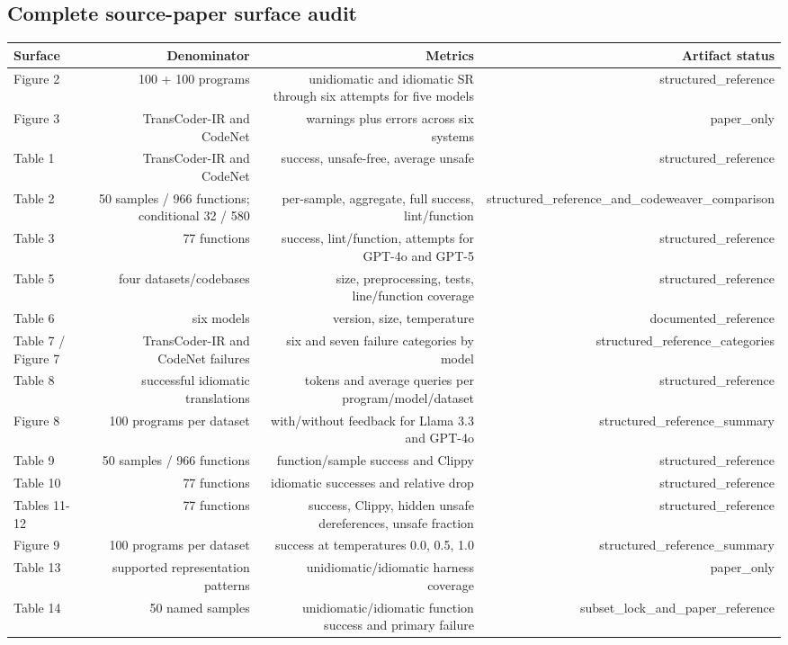 \documentclass{article}
\begin{document}
\subsection*{Complete source-paper surface audit}

\begin{tabular}{lrrr}
\toprule
Surface & Denominator & Metrics & Artifact status \\
\midrule
Figure 2 & 100 + 100 programs & unidiomatic and idiomatic SR through six attempts for five models & structured\_reference \\
Figure 3 & TransCoder-IR and CodeNet & warnings plus errors across six systems & paper\_only \\
Table 1 & TransCoder-IR and CodeNet & success, unsafe-free, average unsafe & structured\_reference \\
Table 2 & 50 samples / 966 functions; conditional 32 / 580 & per-sample, aggregate, full success, lint/function & structured\_reference\_and\_codeweaver\_comparison \\
Table 3 & 77 functions & success, lint/function, attempts for GPT-4o and GPT-5 & structured\_reference \\
Table 5 & four datasets/codebases & size, preprocessing, tests, line/function coverage & structured\_reference \\
Table 6 & six models & version, size, temperature & documented\_reference \\
Table 7 / Figure 7 & TransCoder-IR and CodeNet failures & six and seven failure categories by model & structured\_reference\_categories \\
Table 8 & successful idiomatic translations & tokens and average queries per program/model/dataset & structured\_reference \\
Figure 8 & 100 programs per dataset & with/without feedback for Llama 3.3 and GPT-4o & structured\_reference\_summary \\
Table 9 & 50 samples / 966 functions & function/sample success and Clippy & structured\_reference \\
Table 10 & 77 functions & idiomatic successes and relative drop & structured\_reference \\
Tables 11-12 & 77 functions & success, Clippy, hidden unsafe dereferences, unsafe fraction & structured\_reference \\
Figure 9 & 100 programs per dataset & success at temperatures 0.0, 0.5, 1.0 & structured\_reference\_summary \\
Table 13 & supported representation patterns & unidiomatic/idiomatic harness coverage & paper\_only \\
Table 14 & 50 named samples & unidiomatic/idiomatic function success and primary failure & subset\_lock\_and\_paper\_reference \\
\bottomrule
\end{tabular}
\end{document}
